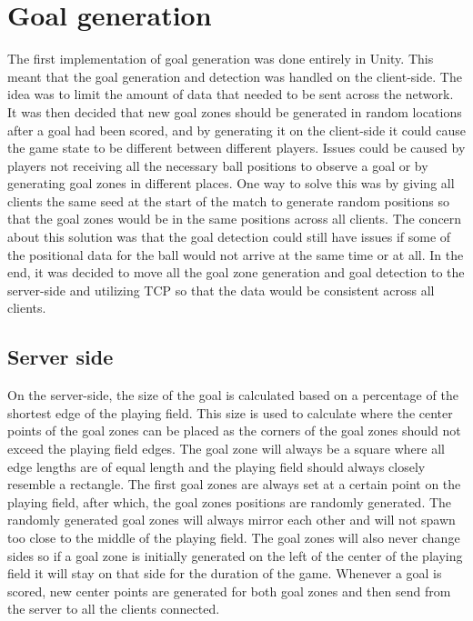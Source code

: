 \section{Goal generation}\label{subsec:goalrefactoring}
The first implementation of goal generation was done entirely in Unity.
This meant that the goal generation and detection was handled on the client-side.
The idea was to limit the amount of data that needed to be sent across the network.
It was then decided that new goal zones should be generated in random locations after a goal had been scored, and by generating it on the client-side it could cause the game state to be different between different players.
Issues could be caused by players not receiving all the necessary ball positions to observe a goal or by generating goal zones in different places.
One way to solve this was by giving all clients the same seed at the start of the match to generate random positions so that the goal zones would be in the same positions across all clients.
The concern about this solution was that the goal detection could still have issues if some of the positional data for the ball would not arrive at the same time or at all.
In the end, it was decided to move all the goal zone generation and goal detection to the server-side and utilizing TCP so that the data would be consistent across all clients.

\subsection{Server side}
On the server-side, the size of the goal is calculated based on a percentage of the shortest edge of the playing field.
This size is used to calculate where the center points of the goal zones can be placed as the corners of the goal zones should not exceed the playing field edges.
The goal zone will always be a square where all edge lengths are of equal length and the playing field should always closely resemble a rectangle.
The first goal zones are always set at a certain point on the playing field, after which, the goal zones positions are randomly generated.
The randomly generated goal zones will always mirror each other and will not spawn too close to the middle of the playing field.
The goal zones will also never change sides so if a goal zone is initially generated on the left of the center of the playing field it will stay on that side for the duration of the game.
Whenever a goal is scored, new center points are generated for both goal zones and then send from the server to all the clients connected.

